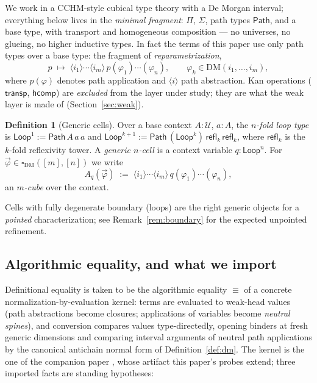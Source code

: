 \documentclass[11pt]{amsart}
\theoremstyle{definition}
\newtheorem{defi}[thm]{Definition}
\newcommand{\DM}[1]{\mathrm{DM}(#1)}
\newcommand{\Dbox}{\square_{\mathrm{DM}}}
\newcommand{\aconv}{\equiv}
\newcommand{\refl}{\mathsf{refl}}
\newcommand{\Path}{\mathsf{Path}}
\newcommand{\Loop}{\mathsf{Loop}}
\newcommand{\U}{\mathcal{U}}
\newcommand{\hcomp}{\mathsf{hcomp}}
\newcommand{\transp}{\mathsf{transp}}
\newcommand{\act}[1]{A_{#1}}
\begin{document}
We work in a CCHM-style cubical type theory \cite{CCHM} with a De
Morgan interval; everything below lives in the \emph{minimal
fragment}: $\Pi$, $\Sigma$, path types $\Path$, and a base type,
with transport and homogeneous composition --- no universes, no
glueing, no higher inductive types.  In fact the terms of this paper
use only path types over a base type: the fragment of
\emph{reparametrization},
\[
  p \;\mapsto\; \langle i_1 \rangle \cdots \langle i_m \rangle\,
  p(\varphi_1)\cdots(\varphi_n),
  \qquad \varphi_k \in \DM{i_1,\dots,i_m},
\]
where $p(\varphi)$ denotes path application and
$\langle i \rangle$ path abstraction.  Kan operations
($\transp$, $\hcomp$) are \emph{excluded} from the layer under
study; they are what the weak layer is made of
(Section~\ref{sec:weak}).

\begin{defi}[Generic cells]\label{def:generic}
  Over a base context $A : \U$, $a : A$, the \emph{$n$-fold loop
  type} is
  $\Loop^1 := \Path\,A\,a\,a$ and
  $\Loop^{k+1} := \Path\,(\Loop^k)\,\refl_k\,\refl_k$, where
  $\refl_k$ is the $k$-fold reflexivity tower.  A \emph{generic
  $n$-cell} is a context variable $q : \Loop^n$.  For
  $\vec\varphi \in \Dbox([m],[n])$ we write
  \[
    \act{q}(\vec\varphi) \;:=\;
    \langle i_1 \rangle \cdots \langle i_m \rangle\,
    q(\varphi_1)\cdots(\varphi_n),
  \]
  an \emph{$m$-cube} over the context.
\end{defi}

Cells with fully degenerate boundary (loops) are the right generic
objects for a \emph{pointed} characterization; see
Remark~\ref{rem:boundary} for the expected unpointed refinement.

\subsection{Algorithmic equality, and what we import}
\label{sec:imported}

Definitional equality is taken to be the algorithmic equality
$\aconv$ of a concrete normalization-by-evaluation kernel: terms are
evaluated to weak-head values (path abstractions become closures;
applications of variables become \emph{neutral spines}), and
conversion compares values type-directedly, opening binders at fresh
generic dimensions and comparing interval arguments of neutral path
applications by the canonical antichain normal form of
Definition~\ref{def:dm}.  The kernel is the one of the companion
paper \cite{Companion}, whose artifact this paper's probes extend;
three imported facts are standing hypotheses:
\end{document}
